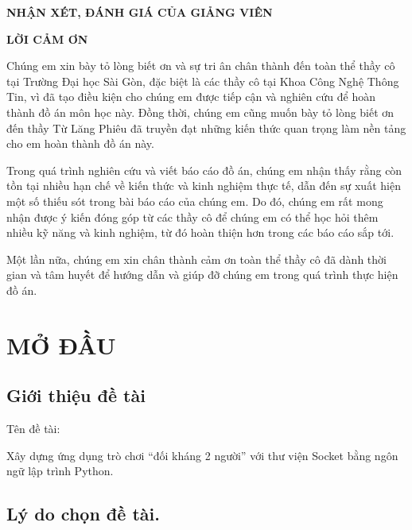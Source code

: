 \documentclass[a4paper]{article}
\begin{document}
\clearpage
\textbf{NHẬN XÉT, ĐÁNH GIÁ CỦA GIẢNG VIÊN}

\clearpage
\textbf{LỜI CẢM ƠN}

Chúng em xin bày tỏ lòng biết ơn và sự tri ân chân thành đến toàn thể
thầy cô tại Trường Đại học Sài Gòn, đặc biệt là các thầy cô tại Khoa
Công Nghệ Thông Tin, vì đã tạo điều kiện cho chúng em được tiếp cận và
nghiên cứu để hoàn thành đồ án môn học này. Đồng thời, chúng em cũng
muốn bày tỏ lòng biết ơn đến thầy Từ Lăng Phiêu đã truyền đạt những kiến
thức quan trọng làm nền tảng cho em hoàn thành đồ án này.

Trong quá trình nghiên cứu và viết báo cáo đồ án, chúng em nhận thấy
rằng còn tồn tại nhiều hạn chế về kiến thức và kinh nghiệm thực tế, dẫn
đến sự xuất hiện một số thiếu sót trong bài báo cáo của chúng em. Do đó,
chúng em rất mong nhận được ý kiến đóng góp từ các thầy cô để chúng em
có thể học hỏi thêm nhiều kỹ năng và kinh nghiệm, từ đó hoàn thiện hơn
trong các báo cáo sắp tới.

Một lần nữa, chúng em xin chân thành cảm ơn toàn thể thầy cô đã dành
thời gian và tâm huyết để hướng dẫn và giúp đỡ chúng em trong quá trình
thực hiện đồ án.

\clearpage
\tableofcontents

\clearpage

\hypertarget{phux1ea7n-i.-mux1edf-ux111ux1ea7u}{%
\section{MỞ ĐẦU}\label{phux1ea7n-i.-mux1edf-ux111ux1ea7u}}

\hypertarget{giux1edbi-thiux1ec7u-ux111ux1ec1-tuxe0i}{%
\subsection{\texorpdfstring{Giới thiệu đề tài
}{Giới thiệu đề tài }}\label{giux1edbi-thiux1ec7u-ux111ux1ec1-tuxe0i}}

Tên đề tài:

Xây dựng ứng dụng trò chơi ``đối kháng 2 người'' với thư viện Socket bằng ngôn ngữ lập trình Python.

\hypertarget{luxfd-do-chux1ecdn-ux111ux1ec1-tuxe0i.}{%
\subsection{\texorpdfstring{Lý do chọn đề tài.
}{Lý do chọn đề tài. }}\label{luxfd-do-chux1ecdn-ux111ux1ec1-tuxe0i.}}
\end{document}
